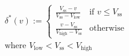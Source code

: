 \begin{equation}
\begin{split}
	&\delta^{*}(v) := 
	\begin{cases} 
		\frac{V_\text{ss} - v}{V_\text{ss} - V_\text{low}} & \text{if } v \leq V_\text{ss} \\
		\frac{v - V_\text{ss}}{V_\text{high} - V_\text{ss}} & \text{otherwise}
	\end{cases}\\
	&\text{where } V_\text{low} < V_\text{ss} < V_\text{high}
\end{split}
\label{ch4:equ:metric-voltage-scaling}
\end{equation}
